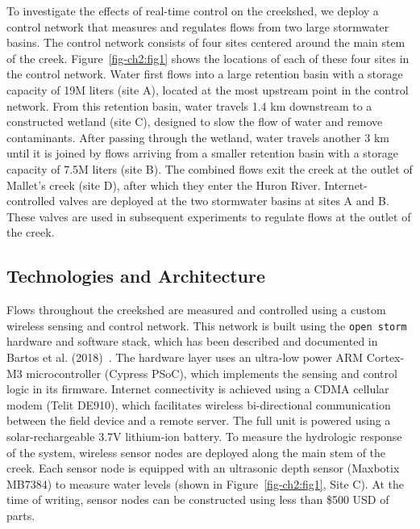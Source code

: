 To investigate the effects of real-time control on the creekshed, we deploy a control network that measures and regulates flows from two large stormwater basins. The control network consists of four sites centered around the main stem of the creek. Figure~\ref{fig-ch2:fig1} shows the locations of each of these four sites in the control network. Water first flows into a large retention basin with a storage capacity of 19M liters (site A), located at the most upstream point in the control network. From this retention basin, water travels 1.4 km downstream to a constructed wetland (site C), designed to slow the flow of water and remove contaminants. After passing through the wetland, water travels another 3 km until it is joined by flows arriving from a smaller retention basin with a storage capacity of 7.5M liters (site B). The combined flows exit the creek at the outlet of Mallet's creek (site D), after which they enter the Huron River. Internet-controlled valves are deployed at the two stormwater basins at sites A and B. These valves are used in subsequent experiments to regulate flows at the outlet of the creek.

\subsection{Technologies and Architecture}

Flows throughout the creekshed are measured and controlled using a custom wireless sensing and control network. This network is built using the \texttt{open storm} hardware and software stack, which has been described and documented in Bartos et al. (2018)~\cite{Bartos_2018}. The hardware layer uses an ultra-low power ARM Cortex-M3 microcontroller (Cypress PSoC), which implements the sensing and control logic in its firmware. Internet connectivity is achieved using a CDMA cellular modem (Telit DE910), which facilitates wireless bi-directional communication between the field device and a remote server. The full unit is powered using a solar-rechargeable 3.7V lithium-ion battery. To measure the hydrologic response of the system, wireless sensor nodes are deployed along the main stem of the creek. Each sensor node is equipped with an ultrasonic depth sensor (Maxbotix MB7384) to measure water levels (shown in Figure~\ref{fig-ch2:fig1}, Site C). At the time of writing, sensor nodes can be constructed using less than \$500 USD of parts. %

